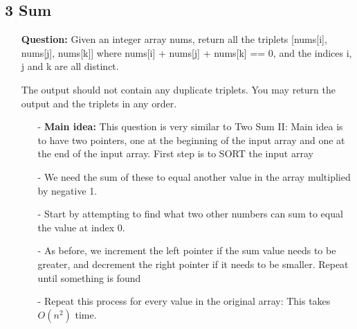 \documentclass[12pt]{article}
\begin{document}
\subsection{3 Sum}
\begin{enumerate}
  \item[] \textbf{Question:} Given an integer array nums, return all the triplets [nums[i], nums[j], nums[k]] where nums[i] + nums[j] + nums[k] == 0, and the indices i, j and k are all distinct.

The output should not contain any duplicate triplets. You may return the output and the triplets in any order.

    \begin{enumerate}
      \item[-] \textbf{Main idea: } This question is very similar to Two Sum II: Main idea is to have two pointers, one at the beginning of the input array and one at the end of the input array. First step is to SORT the input array
      \item[-] We need the sum of these to equal another value in the array multiplied by negative 1. 
      \item[-] Start by attempting to find what two other numbers can sum to equal the value at index 0. 
      \item[-] As before, we increment the left pointer if the sum value needs to be greater, and decrement the right pointer if it needs to be smaller. Repeat until something is found
      \item[-] Repeat this process for every value in the original array: This takes $O(n^2)$ time.
    \end{enumerate}
\end{enumerate}
\end{document}
